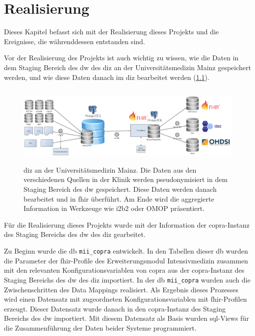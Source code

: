 \chapter{Realisierung} \label{ch:results}

Dieses Kapitel befasst sich mit der Realisierung dieses Projekts und die Ereignisse, die währenddessen entstanden sind.


Vor der Realisierung des Projekts ist auch wichtig zu wissen, wie die Daten in dem Staging Bereich des \ac{dw} des \ac{diz} an der Universitätsmedizin Mainz gespeichert werden, und wie diese Daten danach im \ac{diz} bearbeitet werden (\ref{fig:dizummz}).

\begin{figure}[ht]
	\centering
	\includegraphics[height=4cm]{figures/diz_ummz}
	\caption[\acs{diz} an der Universitätsmedizin Mainz] {\acs{diz} an der Universitätsmedizin Mainz. Die Daten aus den verschiedenen Quellen in der Klinik werden pseudonymisiert in dem Staging Bereich des \ac{dw} gespeichert. Diese Daten werden danach bearbeitet und in \ac{fhir} überführt. Am Ende wird die aggregierte Information in Werkzeuge wie i2b2 oder OMOP präsentiert.}
	\label{fig:dizummz}
\end{figure}

Für die Realisierung dieses Projekts wurde mit der Information der \ac{copra}-Instanz des Staging Bereichs des \ac{dw} des \ac{diz} gearbeitet.

 Zu Beginn wurde die \ac{db} \texttt{mii\_copra} entwickelt. In den Tabellen dieser \ac{db} wurden die Parameter der \ac{fhir}-Profile des Erweiterungsmodul \glqq Intensivmedizin\grqq{} zusammen mit den relevanten Konfigurationsvariablen von \ac{copra} aus der \ac{copra}-Instanz des Staging Bereichs des \ac{dw} des \ac{diz} importiert. In der \ac{db} \texttt{mii\_copra} wurden auch die Zwischenschritten des Data Mappings realisiert. Als Ergebnis dieses Prozesses wird einen Datensatz mit zugeordneten Konfigurationsvariablen mit \ac{fhir}-Profilen erzeugt. Dieser Datensatz wurde danach in den \ac{copra}-Instanz des Staging Bereichs des \ac{dw} importiert. Mit diesem Datensatz als Basis wurden \ac{sql}-Views für die Zusammenführung der Daten beider Systeme programmiert.

